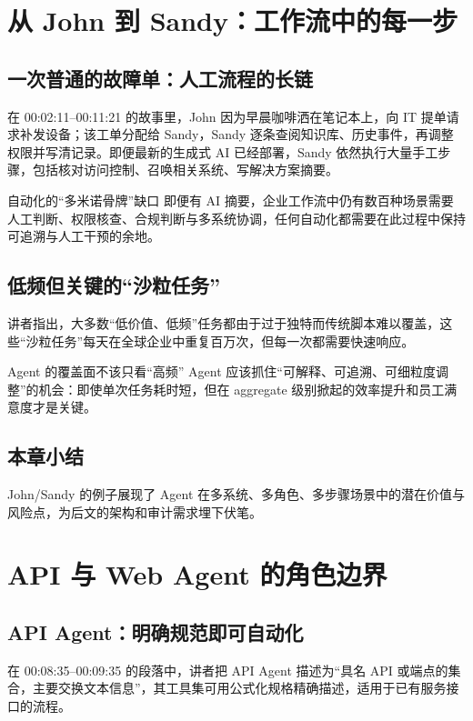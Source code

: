 \documentclass[a4paper]{article}
\begin{document}
\section{从 John 到 Sandy：工作流中的每一步}
\subsection{一次普通的故障单：人工流程的长链}
在 00:02:11--00:11:21 的故事里，John 因为早晨咖啡洒在笔记本上，向 IT 提单请求补发设备；该工单分配给 Sandy，Sandy 逐条查阅知识库、历史事件，再调整权限并写清记录。即便最新的生成式 AI 已经部署，Sandy 依然执行大量手工步骤，包括核对访问控制、召唤相关系统、写解决方案摘要。

\begin{warningbox}{自动化的“多米诺骨牌”缺口}
即便有 AI 摘要，企业工作流中仍有数百种场景需要人工判断、权限核查、合规判断与多系统协调，任何自动化都需要在此过程中保持可追溯与人工干预的余地。
\end{warningbox}

\subsection{低频但关键的“沙粒任务”}
讲者指出，大多数“低价值、低频”任务都由于过于独特而传统脚本难以覆盖，这些“沙粒任务”每天在全球企业中重复百万次，但每一次都需要快速响应。

\begin{importantbox}{Agent 的覆盖面不该只看“高频”
}
Agent 应该抓住“可解释、可追溯、可细粒度调整”的机会：即使单次任务耗时短，但在 aggregate 级别掀起的效率提升和员工满意度才是关键。
\end{importantbox}

\subsection{本章小结}
John/Sandy 的例子展现了 Agent 在多系统、多角色、多步骤场景中的潜在价值与风险点，为后文的架构和审计需求埋下伏笔。

\section{API 与 Web Agent 的角色边界}
\subsection{API Agent：明确规范即可自动化}
在 00:08:35--00:09:35 的段落中，讲者把 API Agent 描述为“具名 API 或端点的集合，主要交换文本信息”，其工具集可用公式化规格精确描述，适用于已有服务接口的流程。
\end{document}
